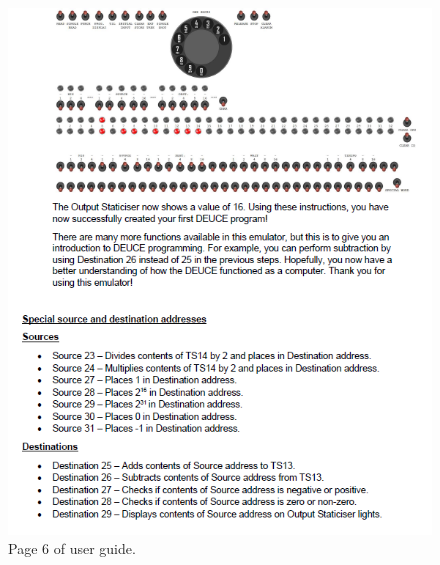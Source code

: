 \documentclass{l4proj}
\begin{document}
\begin{appendices}
\begin{figure}
	\centering
	\includegraphics{images/ug-6}
	\caption{Page 6 of user guide.}
	\label{fig:pg-6}
\end{figure}

\end{appendices}






\end{document}
